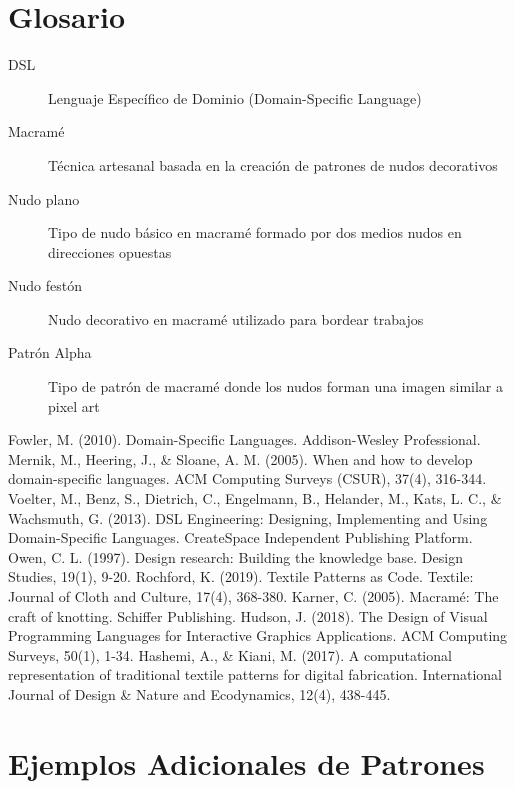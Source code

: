 \documentclass[12pt,a4paper]{report}
\begin{document}
\chapter*{Glosario}
\begin{description}
    \item[DSL] Lenguaje Específico de Dominio (Domain-Specific Language)
    \item[Macramé] Técnica artesanal basada en la creación de patrones de nudos decorativos
    \item[Nudo plano] Tipo de nudo básico en macramé formado por dos medios nudos en direcciones opuestas
    \item[Nudo festón] Nudo decorativo en macramé utilizado para bordear trabajos
    \item[Patrón Alpha] Tipo de patrón de macramé donde los nudos forman una imagen similar a pixel art
\end{description}

\begin{thebibliography}{00}
 Fowler, M. (2010). Domain-Specific Languages. Addison-Wesley Professional.
 Mernik, M., Heering, J., \& Sloane, A. M. (2005). When and how to develop domain-specific languages. ACM Computing Surveys (CSUR), 37(4), 316-344.
 Voelter, M., Benz, S., Dietrich, C., Engelmann, B., Helander, M., Kats, L. C., \& Wachsmuth, G. (2013). DSL Engineering: Designing, Implementing and Using Domain-Specific Languages. CreateSpace Independent Publishing Platform.
 Owen, C. L. (1997). Design research: Building the knowledge base. Design Studies, 19(1), 9-20.
 Rochford, K. (2019). Textile Patterns as Code. Textile: Journal of Cloth and Culture, 17(4), 368-380.
 Karner, C. (2005). Macramé: The craft of knotting. Schiffer Publishing.
 Hudson, J. (2018). The Design of Visual Programming Languages for Interactive Graphics Applications. ACM Computing Surveys, 50(1), 1-34.
 Hashemi, A., \& Kiani, M. (2017). A computational representation of traditional textile patterns for digital fabrication. International Journal of Design \& Nature and Ecodynamics, 12(4), 438-445.
\end{thebibliography}

\appendix
\chapter{Ejemplos Adicionales de Patrones}
\end{document}
